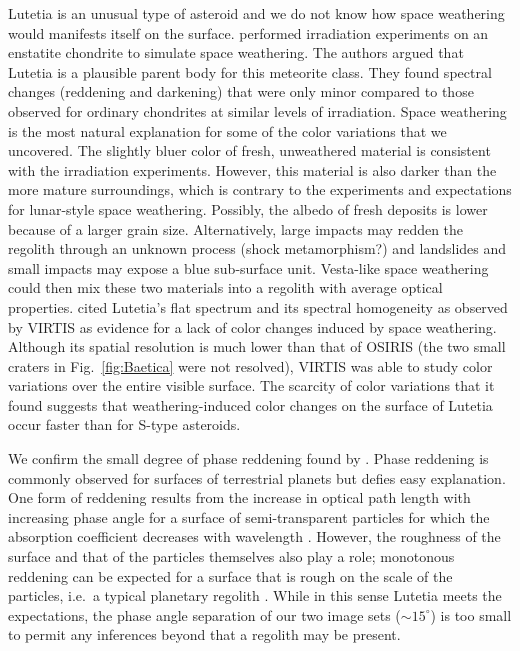 \documentclass[3p,authoryear]{elsarticle}
\begin{document}
Lutetia is an unusual type of asteroid and we do not know how space weathering would manifests itself on the surface. \citet{V09} performed irradiation experiments on an enstatite chondrite to simulate space weathering. The authors argued that Lutetia is a plausible parent body for this meteorite class. They found spectral changes (reddening and darkening) that were only minor compared to those observed for ordinary chondrites at similar levels of irradiation. Space weathering is the most natural explanation for some of the color variations that we uncovered. The slightly bluer color of fresh, unweathered material is consistent with the irradiation experiments. However, this material is also darker than the more mature surroundings, which is contrary to the experiments and expectations for lunar-style space weathering. Possibly, the albedo of fresh deposits is lower because of a larger grain size. Alternatively, large impacts may redden the regolith through an unknown process (shock metamorphism?) and landslides and small impacts may expose a blue sub-surface unit. Vesta-like space weathering could then mix these two materials into a regolith with average optical properties. \citet{C11} cited Lutetia's flat spectrum and its spectral homogeneity as observed by VIRTIS as evidence for a lack of color changes induced by space weathering. Although its spatial resolution is much lower than that of OSIRIS (the two small craters in Fig.~\ref{fig:Baetica} were not resolved), VIRTIS was able to study color variations over the entire visible surface. The scarcity of color variations that it found suggests that weathering-induced color changes on the surface of Lutetia occur faster than for S-type asteroids.

We confirm the small degree of phase reddening found by \citet{Mg12}. Phase reddening is commonly observed for surfaces of terrestrial planets but defies easy explanation. One form of reddening results from the increase in optical path length with increasing phase angle for a surface of semi-transparent particles for which the absorption coefficient decreases with wavelength \citep{AF67}. However, the roughness of the surface and that of the particles themselves also play a role; monotonous reddening can be expected for a surface that is rough on the scale of the particles, i.e.\ a typical planetary regolith \citep{S14}. While in this sense Lutetia meets the expectations, the phase angle separation of our two image sets ($\sim 15^\circ$) is too small to permit any inferences beyond that a regolith may be present.
\end{document}
